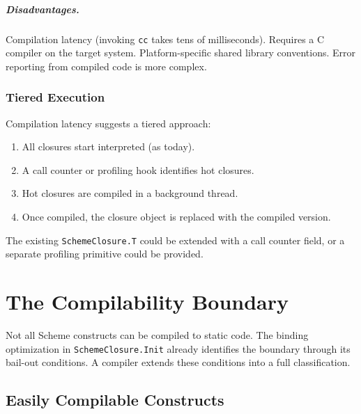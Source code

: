 \documentclass[12pt]{report}
\begin{document}
\paragraph{Disadvantages.}
Compilation latency (invoking \texttt{cc} takes tens of
milliseconds).  Requires a C compiler on the target system.
Platform-specific shared library conventions.  Error reporting
from compiled code is more complex.

\subsection{Tiered Execution}

Compilation latency suggests a tiered approach:

\begin{enumerate}
\item All closures start interpreted (as today).
\item A call counter or profiling hook identifies hot closures.
\item Hot closures are compiled in a background thread.
\item Once compiled, the closure object is replaced with the
  compiled version.
\end{enumerate}

The existing \texttt{SchemeClosure.T} could be extended with a
call counter field, or a separate profiling primitive could be
provided.

\chapter{The Compilability Boundary}
\label{ch:boundary}

Not all Scheme constructs can be compiled to static code.  The
binding optimization in \texttt{SchemeClosure.Init} already
identifies the boundary through its bail-out conditions.
A compiler extends these conditions into a full classification.

\section{Easily Compilable Constructs}
\end{document}
